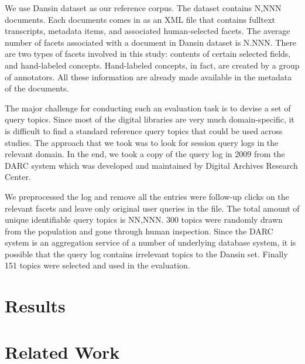We use Dansin dataset as our reference corpus.  The dataset contains N,NNN
documents.  Each documents comes in as an XML file that contains fulltext
transcripts, metadata items, and associated human-selected facets.  The average
number of facets associated with a document in Dansin dataset is N.NNN.  There
are two types of facets involved in this study: contents of certain selected
fields, and hand-labeled concepts.  Hand-labeled concepts, in fact, are created
by a group of annotators.  All these information are already made available in
the metadata of the documents.

The major challenge for conducting such an evaluation task is to devise a set
of query topics.  Since most of the digital libraries are very much
domain-specific, it is difficult to find a standard reference query topics that
could be used across studies.  The approach that we took was to look for
session query logs in the relevant domain.  In the end, we took a copy of the
query log in 2009 from the DARC system which was developed and maintained by
Digital Archives Research Center.  

We preprocessed the log and remove all the entries were follow-up clicks on the
relevant facets and leave only original user queries in the file.  The total
amount of unique identifiable query topics is NN,NNN.  300 topics were randomly
drawn from the population and gone through human inspection.  Since the DARC
system is an aggregation service of a number of underlying database system, it
is possible that the query log contains irrelevant topics to the Dansin set.
Finally 151 topics were selected and used in the evaluation.


\section{Results}


\section{Related Work}

